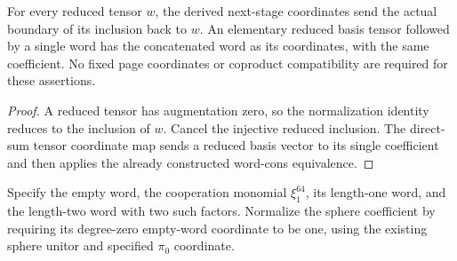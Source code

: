 \begin{proposition}
  \label{prop:h6-reduced-boundary-coordinates}
  \leanok
  For every reduced tensor $w$, the derived next-stage coordinates send
  the actual boundary of its inclusion back to $w$. An elementary reduced
  basis tensor followed by a single word has the concatenated word as
  its coordinates, with the same coefficient. No fixed page coordinates
  or coproduct compatibility are required for these assertions.
\end{proposition}
\begin{proof}
  A reduced tensor has augmentation zero, so the normalization identity
  reduces to the inclusion of $w$. Cancel the injective reduced inclusion.
  The direct-sum tensor coordinate map sends a reduced basis vector to its
  single coefficient and then applies the already constructed word-cons
  equivalence.
  \leanok
\end{proof}

\begin{definition}
  \label{def:h6-normalized-word-representatives}
  \leanok
  Specify the empty word, the cooperation monomial $\xi_1^{64}$, its
  length-one word, and the length-two word with two such factors. Normalize
  the sphere coefficient by requiring its degree-zero empty-word coordinate
  to be one, using the existing sphere unitor and specified $\pi_0$ coordinate.
\end{definition}

